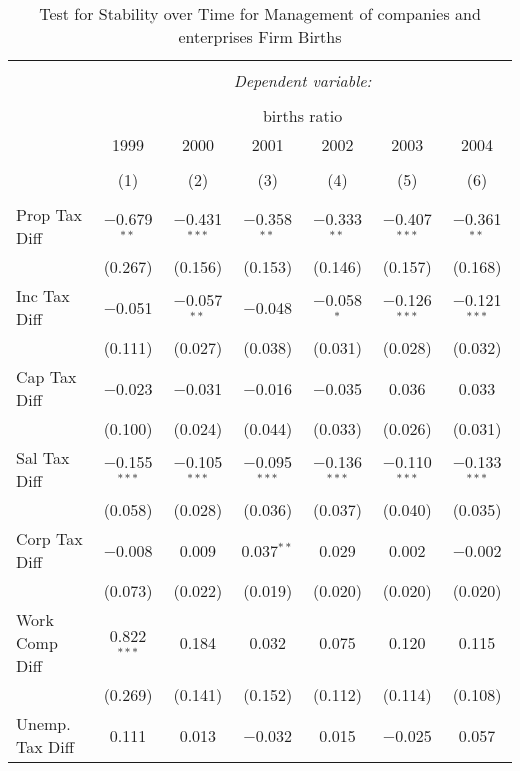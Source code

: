 
\begin{table}[!htbp] \centering 
  \caption{Test for Stability over Time for  Management of companies and enterprises Firm Births} 
  \label{55year} 
\small 
\begin{tabular}{@{\extracolsep{5pt}}lcccccc} 
\\[-1.8ex]\hline 
\hline \\[-1.8ex] 
 & \multicolumn{6}{c}{\textit{Dependent variable:}} \\ 
\cline{2-7} 
\\[-1.8ex] & \multicolumn{6}{c}{births ratio} \\ 
 & 1999 & 2000 & 2001 & 2002 & 2003 & 2004 \\ 
\\[-1.8ex] & (1) & (2) & (3) & (4) & (5) & (6)\\ 
\hline \\[-1.8ex] 
 Prop Tax Diff & $-$0.679$^{**}$ & $-$0.431$^{***}$ & $-$0.358$^{**}$ & $-$0.333$^{**}$ & $-$0.407$^{***}$ & $-$0.361$^{**}$ \\ 
  & (0.267) & (0.156) & (0.153) & (0.146) & (0.157) & (0.168) \\ 
  Inc Tax Diff & $-$0.051 & $-$0.057$^{**}$ & $-$0.048 & $-$0.058$^{*}$ & $-$0.126$^{***}$ & $-$0.121$^{***}$ \\ 
  & (0.111) & (0.027) & (0.038) & (0.031) & (0.028) & (0.032) \\ 
  Cap Tax Diff & $-$0.023 & $-$0.031 & $-$0.016 & $-$0.035 & 0.036 & 0.033 \\ 
  & (0.100) & (0.024) & (0.044) & (0.033) & (0.026) & (0.031) \\ 
  Sal Tax Diff & $-$0.155$^{***}$ & $-$0.105$^{***}$ & $-$0.095$^{***}$ & $-$0.136$^{***}$ & $-$0.110$^{***}$ & $-$0.133$^{***}$ \\ 
  & (0.058) & (0.028) & (0.036) & (0.037) & (0.040) & (0.035) \\ 
  Corp Tax Diff & $-$0.008 & 0.009 & 0.037$^{**}$ & 0.029 & 0.002 & $-$0.002 \\ 
  & (0.073) & (0.022) & (0.019) & (0.020) & (0.020) & (0.020) \\ 
  Work Comp Diff & 0.822$^{***}$ & 0.184 & 0.032 & 0.075 & 0.120 & 0.115 \\ 
  & (0.269) & (0.141) & (0.152) & (0.112) & (0.114) & (0.108) \\ 
  Unemp. Tax Diff & 0.111 & 0.013 & $-$0.032 & 0.015 & $-$0.025 & 0.057 \\ 

\end{tabular}
\end{table}
